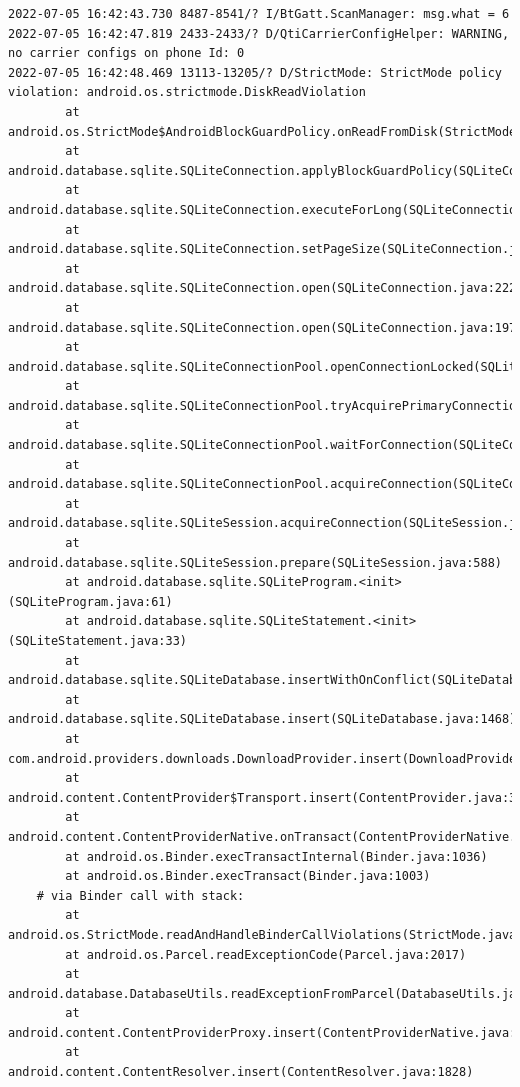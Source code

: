 \documentclass[a4paper,12pt]{book}
\begin{document}
\begin{lstlisting}
2022-07-05 16:42:43.730 8487-8541/? I/BtGatt.ScanManager: msg.what = 6
2022-07-05 16:42:47.819 2433-2433/? D/QtiCarrierConfigHelper: WARNING, no carrier configs on phone Id: 0
2022-07-05 16:42:48.469 13113-13205/? D/StrictMode: StrictMode policy violation: android.os.strictmode.DiskReadViolation
        at android.os.StrictMode$AndroidBlockGuardPolicy.onReadFromDisk(StrictMode.java:1571)
        at android.database.sqlite.SQLiteConnection.applyBlockGuardPolicy(SQLiteConnection.java:1138)
        at android.database.sqlite.SQLiteConnection.executeForLong(SQLiteConnection.java:688)
        at android.database.sqlite.SQLiteConnection.setPageSize(SQLiteConnection.java:260)
        at android.database.sqlite.SQLiteConnection.open(SQLiteConnection.java:222)
        at android.database.sqlite.SQLiteConnection.open(SQLiteConnection.java:197)
        at android.database.sqlite.SQLiteConnectionPool.openConnectionLocked(SQLiteConnectionPool.java:505)
        at android.database.sqlite.SQLiteConnectionPool.tryAcquirePrimaryConnectionLocked(SQLiteConnectionPool.java:949)
        at android.database.sqlite.SQLiteConnectionPool.waitForConnection(SQLiteConnectionPool.java:699)
        at android.database.sqlite.SQLiteConnectionPool.acquireConnection(SQLiteConnectionPool.java:380)
        at android.database.sqlite.SQLiteSession.acquireConnection(SQLiteSession.java:896)
        at android.database.sqlite.SQLiteSession.prepare(SQLiteSession.java:588)
        at android.database.sqlite.SQLiteProgram.<init>(SQLiteProgram.java:61)
        at android.database.sqlite.SQLiteStatement.<init>(SQLiteStatement.java:33)
        at android.database.sqlite.SQLiteDatabase.insertWithOnConflict(SQLiteDatabase.java:1597)
        at android.database.sqlite.SQLiteDatabase.insert(SQLiteDatabase.java:1468)
        at com.android.providers.downloads.DownloadProvider.insert(DownloadProvider.java:972)
        at android.content.ContentProvider$Transport.insert(ContentProvider.java:309)
        at android.content.ContentProviderNative.onTransact(ContentProviderNative.java:154)
        at android.os.Binder.execTransactInternal(Binder.java:1036)
        at android.os.Binder.execTransact(Binder.java:1003)
    # via Binder call with stack:
        at android.os.StrictMode.readAndHandleBinderCallViolations(StrictMode.java:2289)
        at android.os.Parcel.readExceptionCode(Parcel.java:2017)
        at android.database.DatabaseUtils.readExceptionFromParcel(DatabaseUtils.java:137)
        at android.content.ContentProviderProxy.insert(ContentProviderNative.java:481)
        at android.content.ContentResolver.insert(ContentResolver.java:1828)

\end{lstlisting}
\end{document}
